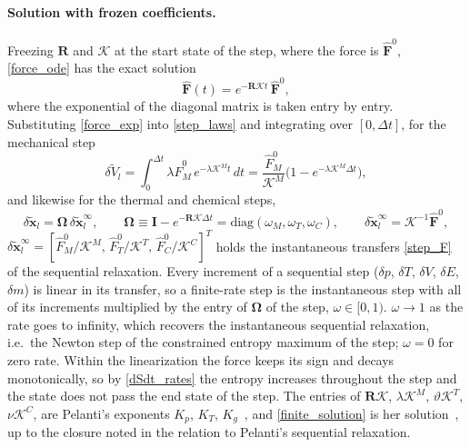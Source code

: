 \paragraph{Solution with frozen coefficients.}
Freezing $\boldsymbol{R}$ and $\boldsymbol{\mathcal{K}}$ at the start state of the step, where the force is $\hat{\boldsymbol{F}}^0$, \eqref{force_ode} has the exact solution
\begin{equation}\label{force_exp}
\hat{\boldsymbol{F}}(t)=e^{-\boldsymbol{R}\boldsymbol{\mathcal{K}}t}\,\hat{\boldsymbol{F}}^0,
\end{equation}
where the exponential of the diagonal matrix is taken entry by entry.
Substituting \eqref{force_exp} into \eqref{step_laws} and integrating over $[0,\Delta t]$, for the mechanical step
\begin{equation}
\delta\tilde{V}_l=\int_0^{\Delta t}\lambda \hat{F}_M^0\,e^{-\lambda\mathcal{K}^Mt}\,dt=\frac{\hat{F}_M^0}{\mathcal{K}^M}\bigl(1-e^{-\lambda\mathcal{K}^M\Delta t}\bigr),
\end{equation}
and likewise for the thermal and chemical steps,
\begin{equation}\label{finite_solution}
\delta\tilde{\boldsymbol{x}}_l=\boldsymbol{\Omega}\,\delta\tilde{\boldsymbol{x}}_l^\infty,\qquad \boldsymbol{\Omega}\equiv\boldsymbol{I}-e^{-\boldsymbol{R}\boldsymbol{\mathcal{K}}\Delta t}=\mathrm{diag}(\omega_M,\omega_T,\omega_C),\qquad
\delta\tilde{\boldsymbol{x}}_l^\infty=\boldsymbol{\mathcal{K}}^{-1}\hat{\boldsymbol{F}}^0,
\end{equation}
$\delta\tilde{\boldsymbol{x}}_l^\infty=[\hat{F}_M^0/\mathcal{K}^M,\,\hat{F}_T^0/\mathcal{K}^T,\,\hat{F}_C^0/\mathcal{K}^C]^T$ holds the instantaneous transfers \eqref{step_F} of the sequential relaxation. Every increment of a sequential step ($\delta p$, $\delta T$, $\delta V$, $\delta E$, $\delta m$) is linear in its transfer, so a finite-rate step is the instantaneous step with all of its increments multiplied by the entry of $\boldsymbol{\Omega}$ of the step, $\omega\in[0,1)$. $\omega\to1$ as the rate goes to infinity, which recovers the instantaneous sequential relaxation, i.e.\ the Newton step of the constrained entropy maximum of the step; $\omega=0$ for zero rate. Within the linearization the force keeps its sign and decays monotonically, so by \eqref{dSdt_rates} the entropy increases throughout the step and the state does not pass the end state of the step. The entries of $\boldsymbol{R}\boldsymbol{\mathcal{K}}$, $\lambda\mathcal{K}^M$, $\vartheta\mathcal{K}^T$, $\nu\mathcal{K}^C$, are Pelanti's exponents $K_p$, $K_T$, $K_g$~\cite[eqs.~(55), (66), (76)]{Pelanti2022}, and \eqref{finite_solution} is her solution~\cite[eqs.~(54), (56), (65), (67), (75), (77)]{Pelanti2022}, up to the closure noted in the relation to Pelanti's sequential relaxation.

